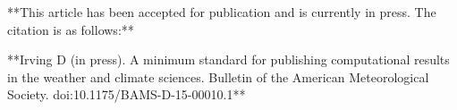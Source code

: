 **This article has been accepted for publication and is currently in press. The citation is as follows:**    

**Irving D (in press). A minimum standard for publishing computational results in the weather and climate sciences. Bulletin of the American Meteorological Society. doi:10.1175/BAMS-D-15-00010.1**